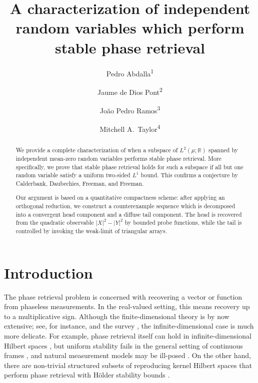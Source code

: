 \documentclass[11pt]{amsart}
\title{A characterization of independent random variables which perform stable phase retrieval}
\author{Pedro Abdalla\textsuperscript{1}}
\author{Jaume de Dios Pont\textsuperscript{2}}
\author{Jo\~ao Pedro Ramos\textsuperscript{3}}
\author{Mitchell A.~Taylor\textsuperscript{4}}
\begin{document}
\begin{abstract}
We provide a complete characterization of when a subspace of $L^2(\mu;\mathbb{R})$ spanned by independent mean-zero
random variables performs stable phase retrieval. More specifically, we prove that stable phase retrieval holds for such a subspace if all but one random variable satisfy a uniform two-sided $L^1$ bound. This confirms a conjecture by Calderbank,
Daubechies, Freeman, and Freeman. %

Our
argument is based on a quantitative compactness scheme: after applying an orthogonal reduction, we construct 
a counterexample sequence which is decomposed into a convergent head component and a
diffuse tail component. The head is recovered from the quadratic observable
$|X|^2-|Y|^2$ by bounded probe functions, while the tail is controlled by invoking the weak-limit of triangular arrays. %
\end{abstract}
\maketitle
{}
\begingroup
\renewcommand{\thefootnote}{\arabic{footnote}}
\endgroup
\setcounter{footnote}{0}

\section{Introduction}

The phase retrieval problem is concerned with recovering a vector or function
from phaseless measurements. In the real-valued setting, this means recovery up to a multiplicative
sign. Although the finite-dimensional theory is by now extensive; see, for instance,
\cite{bandeira2014saving,eldar2014stability} and the survey
\cite{grohs2020survey}, the infinite-dimensional case is much more
delicate. For example, phase retrieval itself can hold in infinite-dimensional Hilbert
spaces \cite{cahill2016infinite}, but uniform stability fails in the general
setting of continuous frames \cite{alaifari2017continuous,alaifari2025cheeger}, and natural
measurement models may be ill-posed \cite{alaifari2021gabor}. On the other hand, there are non-trivial
structured subsets of reproducing kernel Hilbert spaces that perform phase retrieval with H\"older stability bounds \cite{cahill2016infinite,freeman2025cahill}.
\end{document}
